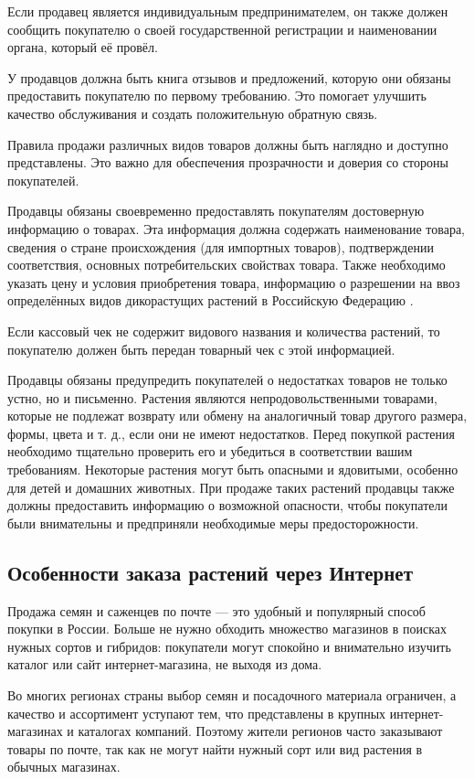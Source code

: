 Если продавец является индивидуальным предпринимателем, он также должен сообщить покупателю о своей государственной регистрации и наименовании органа, который её провёл.

У продавцов должна быть книга отзывов и предложений, которую они обязаны предоставить покупателю по первому требованию. Это помогает улучшить качество обслуживания и создать положительную обратную связь.

Правила продажи различных видов товаров должны быть наглядно и доступно представлены. Это важно для обеспечения прозрачности и доверия со стороны покупателей.

Продавцы обязаны своевременно предоставлять покупателям достоверную информацию о товарах. Эта информация должна содержать наименование товара, сведения о стране происхождения (для импортных товаров), подтверждении соответствия, основных потребительских свойствах товара. Также необходимо указать цену и условия приобретения товара, информацию о разрешении на ввоз определённых видов дикорастущих растений в Российскую Федерацию \cite{rf}.

Если кассовый чек не содержит видового названия и количества растений, то покупателю должен быть передан товарный чек с этой информацией.

Продавцы обязаны предупредить покупателей о недостатках товаров не только устно, но и письменно.
Растения являются непродовольственными товарами, которые не подлежат возврату или обмену на аналогичный товар другого размера, формы, цвета и т. д., если они не имеют недостатков. Перед покупкой растения необходимо тщательно проверить его и убедиться в соответствии вашим требованиям. 
Некоторые растения могут быть опасными и ядовитыми, особенно для детей и домашних животных. При продаже таких растений продавцы также должны предоставить информацию о возможной опасности, чтобы покупатели были внимательны и предприняли необходимые меры предосторожности.


\subsection{Особенности заказа растений через Интернет}

Продажа семян и саженцев по почте — это удобный и популярный способ покупки в России. Больше не нужно обходить множество магазинов в поисках нужных сортов и гибридов: покупатели могут спокойно и внимательно изучить каталог или сайт интернет-магазина, не выходя из дома.

Во многих регионах страны выбор семян и посадочного материала ограничен, а качество и ассортимент уступают тем, что представлены в крупных интернет-магазинах и каталогах компаний. Поэтому жители регионов часто заказывают товары по почте, так как не могут найти нужный сорт или вид растения в обычных магазинах.

